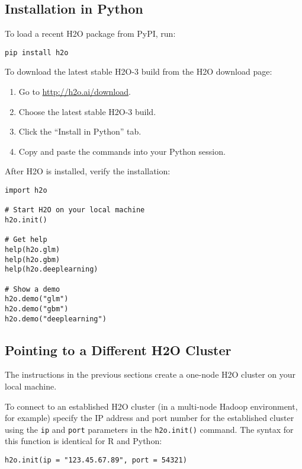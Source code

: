 \documentclass{standalone}
\begin{document}
\subsection{Installation in Python}

To load a recent H2O package from PyPI, run:

\begin{lstlisting}[style=python]
pip install h2o
\end{lstlisting}

To download the
latest stable H2O-3 build from the H2O download page:

\begin{minipage}{\textwidth}

\begin{enumerate}
\item Go to {\url{http://h2o.ai/download}}.
\item Choose the latest stable H2O-3 build.
\item Click the ``Install in Python'' tab.
\item Copy and paste the commands into your Python session.
\end{enumerate}

\end{minipage}

\bigskip
After H2O is installed, verify the installation:

\begin{minipage}{\textwidth}

\begin{lstlisting}[style=python]
import h2o

# Start H2O on your local machine
h2o.init()

# Get help
help(h2o.glm)
help(h2o.gbm)
help(h2o.deeplearning)

# Show a demo
h2o.demo("glm")
h2o.demo("gbm")
h2o.demo("deeplearning")

\end{lstlisting}

\end{minipage}

\subsection{Pointing to a Different H2O Cluster}

The instructions in the previous sections create a one-node H2O cluster on your local machine. 

To connect to an established H2O cluster (in a multi-node Hadoop environment, for example) specify the IP address and port number for the established cluster using the \texttt{ip} and \texttt{port} parameters in the \texttt{h2o.init()} command.  The syntax for this function is identical for R and Python:
\medskip  

\begin{lstlisting}[style=R]
h2o.init(ip = "123.45.67.89", port = 54321)
\end{lstlisting}

\end{document}
